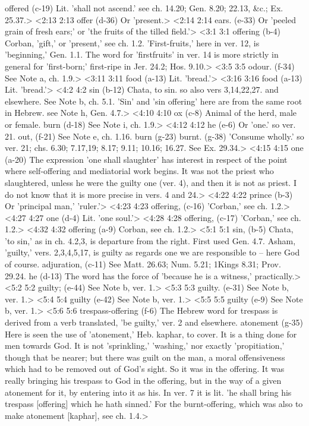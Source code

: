   offered (c-19)  Lit. 'shall not ascend.' see ch. 14.20; Gen. 8.20; 22.13,  &c.; Ex. 25.37.>
<2:13 2:13  offer (d-36)  Or 'present.>
<2:14 2:14  ears. (e-33)  Or 'peeled grain of fresh ears;' or 'the fruits of the tilled  field.'>
<3:1 3:1  offering (b-4)  Corban, 'gift,' or 'present,' see ch. 1.2. 'First-fruits,'  here in ver. 12, is 'beginning,' Gen. 1.1. The word for  'firstfruits' in ver. 14 is more strictly in general for  'first-born;' first-ripe in Jer. 24.2; Hos. 9.10.>
<3:5 3:5  odour. (f-34)  See Note a, ch. 1.9.>
<3:11 3:11  food (a-13) Lit. 'bread.'>
<3:16 3:16  food (a-13)  Lit. 'bread.'>
<4:2 4:2  sin (b-12)  Chata, to sin. so also vers 3,14,22,27. and elsewhere. See  Note b, ch. 5.1. 'Sin' and 'sin offering' here are from the  same root in Hebrew. see Note h, Gen. 4.7.>
<4:10 4:10  ox (c-8)  Animal of the herd, male or female.
  burn (d-18)  See Note i, ch. 1.9.>
<4:12 4:12  he (e-6)  Or 'one.' so ver. 21.
  out, (f-21)  See Note e, ch. 1.16.
  burn (g-23)  burnt. (g-38)
  'Consume wholly.' so ver. 21; chs. 6.30; 7.17,19; 8.17; 9.11;  10.16; 16.27. See Ex. 29.34.>
<4:15 4:15  one (a-20)  The expression 'one shall slaughter' has interest in respect  of the point where self-offering and mediatorial work begins.  It was not the priest who slaughtered, unless he were the  guilty one (ver. 4), and then it is not as priest. I do not  know that it is more precise in vers. 4 and 24.>
<4:22 4:22  prince (b-3)  Or 'principal man,' 'ruler.'>
<4:23 4:23  offering, (c-16) 'Corban,' see ch. 1.2.>
<4:27 4:27  one (d-4)  Lit. 'one soul.'>
<4:28 4:28  offering, (c-17)  'Corban,' see ch. 1.2.>
<4:32 4:32  offering (a-9)  Corban, see ch. 1.2.>
<5:1 5:1  sin, (b-5)  Chata, 'to sin,' as in ch. 4.2,3, is departure from the  right. First used Gen. 4.7. Asham, 'guilty,' vers.  2,3,4,5,17, is guilty as regards one we are responsible to --  here God of course.
  adjuration, (c-11)  See Matt. 26.63; Num. 5.21; 1Kings 8.31; Prov. 29.24.
  he (d-13)  The word has the force of 'because he is a witness,'  practically.>
<5:2 5:2  guilty; (e-44) See Note b, ver. 1.>
<5:3 5:3  guilty. (e-31) See Note b, ver. 1.>
<5:4 5:4  guilty (e-42) See Note b, ver. 1.>
<5:5 5:5  guilty (e-9)  See Note b, ver. 1.>
<5:6 5:6  trespass-offering (f-6) The Hebrew word for trespass is derived from a verb translated, 'be guilty,' ver. 2 and elsewhere.
  atonement (g-35)  Here is seen the use of 'atonement,' Heb. kaphar, to cover.  It is a thing done for men towards God. It is not  'sprinkling,' 'washing,' nor exactly 'propitiation,' though  that be nearer; but there was guilt on the man, a moral  offensiveness which had to be removed out of God's sight. So it  was in the offering. It was really bringing his trespass to God  in the offering, but in the way of a given atonement for it, by  entering into it as his. In ver. 7 it is lit. 'he shall bring  his trespass [offering] which he hath sinned.' For the  burnt-offering, which was also to make atonement [kaphar],  see ch. 1.4.>
